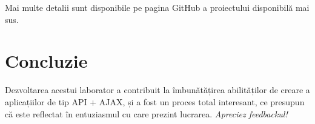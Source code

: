 \documentclass[12pt. a4paper]{report}
\begin{document}
Mai multe detalii sunt disponibile pe pagina GitHub a proiectului disponibilă mai sus.

\chapter{Concluzie}
Dezvoltarea acestui laborator a contribuit la îmbunătățirea abilităților de creare a aplicațiilor de tip API + AJAX, și a fost un proces total interesant, ce presupun că este reflectat în entuziasmul cu care prezint lucrarea. \emph{Apreciez feedbackul!}
\end{document}
